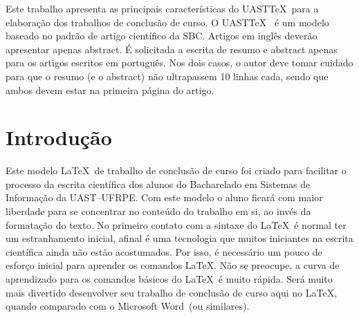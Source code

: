 \documentclass[portuguese,noindentfirst]{UASTeX} %
\begin{document}
 

\begin{abstract} %
        This work presents the main features of UAS\TeX~for writing undergraduate dissertations. UAS\TeX~is a template based on the SBC scientific paper standard. For papers in english, you should add just an abstract while for the papers in portuguese, we also ask for an abstract in portuguese. In both cases, abstracts should not have more than 10 lines and must be in the first page of the paper.
\end{abstract}

\begin{resumo} %
        Este trabalho apresenta as principais características do UAST\TeX~para a elaboração dos trabalhos de conclusão de curso. O UAST\TeX~ é um modelo baseado no padrão de artigo científico da SBC. Artigos em inglês deverão apresentar apenas abstract. É solicitada a escrita de resumo e abstract apenas para os artigos escritos em português. Nos dois casos, o autor deve tomar cuidado para que o resumo (e o abstract) não ultrapassem 10 linhas cada, sendo que ambos devem estar na primeira página do artigo.
\end{resumo}


\section{Introdução}\label{sec:intro}
Este modelo \LaTeX~de trabalho de conclusão de curso foi criado para facilitar o processo da escrita científica dos alunos do Bacharelado em Sistemas de Informação da UAST--UFRPE. Com este modelo o aluno ficará com maior liberdade para se concentrar no conteúdo do trabalho em si, ao invés da formatação do texto. No primeiro contato com a sintaxe do \LaTeX~é normal ter um estranhamento inicial, afinal é uma tecnologia que muitos iniciantes na escrita científica ainda não estão acostumados. Por isso, é necessário um pouco de esforço inicial para aprender os comandos \LaTeX. Não se preocupe, a curva de aprendizado para os comandos básicos do \LaTeX~é muito rápida. Será muito mais divertido desenvolver seu trabalho de conclusão de curso aqui no \LaTeX, quando comparado com o Microsoft Word\textregistered~(ou similares).
\end{document}
